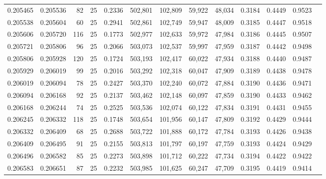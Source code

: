 \begin{tabular}{rrrrrrrrrrrrr}
0.205465 & 0.205536 &    82 &  25 &                                     0.2336 & 502,801 & 102,809 &  59,922 &  48,034 & 0.3184 & 0.4449 & 0.9523 \\
0.205538 & 0.205604 &    60 &  25 &                                     0.2941 & 502,861 & 102,749 &  59,947 &  48,009 & 0.3185 & 0.4447 & 0.9518 \\
0.205606 & 0.205720 &   116 &  25 &                                     0.1773 & 502,977 & 102,633 &  59,972 &  47,984 & 0.3186 & 0.4445 & 0.9507 \\
0.205721 & 0.205806 &    96 &  25 &                                     0.2066 & 503,073 & 102,537 &  59,997 &  47,959 & 0.3187 & 0.4442 & 0.9498 \\
0.205806 & 0.205928 &   120 &  25 &                                     0.1724 & 503,193 & 102,417 &  60,022 &  47,934 & 0.3188 & 0.4440 & 0.9487 \\
0.205929 & 0.206019 &    99 &  25 &                                     0.2016 & 503,292 & 102,318 &  60,047 &  47,909 & 0.3189 & 0.4438 & 0.9478 \\
0.206019 & 0.206094 &    78 &  25 &                                     0.2427 & 503,370 & 102,240 &  60,072 &  47,884 & 0.3190 & 0.4436 & 0.9471 \\
0.206094 & 0.206168 &    92 &  25 &                                     0.2137 & 503,462 & 102,148 &  60,097 &  47,859 & 0.3190 & 0.4433 & 0.9462 \\
0.206168 & 0.206244 &    74 &  25 &                                     0.2525 & 503,536 & 102,074 &  60,122 &  47,834 & 0.3191 & 0.4431 & 0.9455 \\
0.206245 & 0.206332 &   118 &  25 &                                     0.1748 & 503,654 & 101,956 &  60,147 &  47,809 & 0.3192 & 0.4429 & 0.9444 \\
0.206332 & 0.206409 &    68 &  25 &                                     0.2688 & 503,722 & 101,888 &  60,172 &  47,784 & 0.3193 & 0.4426 & 0.9438 \\
0.206409 & 0.206495 &    91 &  25 &                                     0.2155 & 503,813 & 101,797 &  60,197 &  47,759 & 0.3193 & 0.4424 & 0.9429 \\
0.206496 & 0.206582 &    85 &  25 &                                     0.2273 & 503,898 & 101,712 &  60,222 &  47,734 & 0.3194 & 0.4422 & 0.9422 \\
0.206583 & 0.206651 &    87 &  25 &                                     0.2232 & 503,985 & 101,625 &  60,247 &  47,709 & 0.3195 & 0.4419 & 0.9414 \\

\end{tabular}
